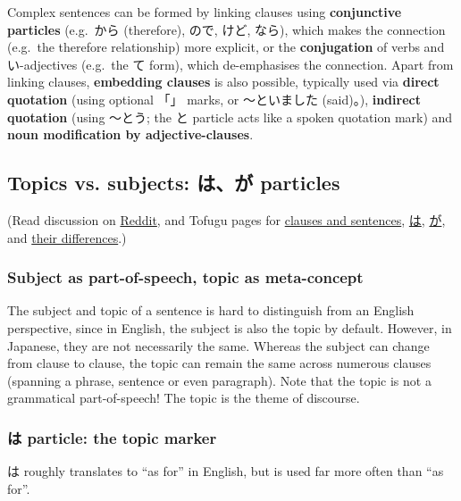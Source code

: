 \documentclass[../nihongo-gakushuu-kyouzai.tex]{subfiles}
\begin{document}
Complex sentences can be formed by linking clauses using \textbf{conjunctive particles} (e.g.\ から (therefore), ので, けど, なら), which makes the connection (e.g.\ the therefore relationship) more explicit, or the \textbf{conjugation} of verbs and い-adjectives (e.g.\ the て form), which de-emphasises the connection. Apart from linking clauses, \textbf{embedding clauses} is also possible, typically used via \textbf{direct quotation} (using optional 「」 marks, or 〜といました (said)。), \textbf{indirect quotation} (using 〜とう; the と particle acts like a spoken quotation mark) and \textbf{noun modification by adjective-clauses}.

\subsection{Topics vs. subjects: は、が particles} \label{sec:topics-and-subjects}
(Read discussion on \href{https://www.reddit.com/r/LearnJapanese/comments/jt49jj/please_stop_thinking_in_terms_of_\%E3\%81\%AF_vs_\%E3\%81\%8C/}{Reddit}, and Tofugu pages for \href{https://www.tofugu.com/japanese-grammar/sentences-and-clauses/}{clauses and sentences}, \href{https://www.tofugu.com/japanese-grammar/particle-wa/}{は}, \href{https://www.tofugu.com/japanese-grammar/particle-ga/}{が}, and \href{https://www.tofugu.com/japanese/wa-and-ga/}{their differences}.)

\subsubsection{Subject as part-of-speech, topic as meta-concept}
The subject and topic of a sentence is hard to distinguish from an English perspective, since in English, the subject is also the topic by default. However, in Japanese, they are not necessarily the same. Whereas the subject can change from clause to clause, the topic can remain the same across numerous clauses (spanning a phrase, sentence or even paragraph). Note that the topic is not a grammatical part-of-speech! The topic is the theme of discourse.

\subsubsection{は particle: the topic marker} \label{sec:topic-marker}
は roughly translates to ``as for'' in English, but is used far more often than ``as for''.
\end{document}
